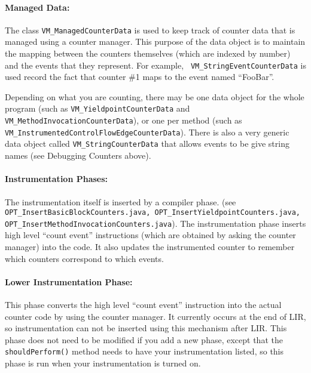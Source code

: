\paragraph{Managed Data:} The class {\tt VM\_ManagedCounterData} is used to
keep track of counter data that is managed using a counter
manager. This purpose of the data object is to maintain the mapping
between the counters themselves (which are indexed by number) and the
events that they represent.  For example, {\tt
VM\_StringEventCounterData} is used record the fact that counter \#1
maps to the event named ``FooBar''.  


Depending on what you are counting, there may be one data object for
the whole program (such as {\tt VM\_YieldpointCounterData} and
{\tt VM\_MethodInvocationCounterData}), or one per method (such as
{\tt VM\_InstrumentedControlFlowEdgeCounterData}).  There is also a
very generic data object called {\tt VM\_StringCounterData} that
allows events to be give string names (see Debugging Counters above).

\paragraph{Instrumentation Phases:}  The instrumentation itself is
inserted by a compiler phase.  (see
{\tt OPT\_InsertBasicBlockCounters.java,
OPT\_InsertYieldpointCounters.java,
OPT\_InsertMethodInvocationCounters.java}).  The instrumentation phase
inserts high level ``count event'' instructions (which are obtained by
asking the counter manager) into the code.  It also updates the
instrumented counter to remember which counters correspond to which
events.

\paragraph{Lower Instrumentation Phase:}  This phase 
converts the high level ``count event'' instruction into the actual
counter code by using the counter manager.  It currently occurs at the
end of LIR, so instrumentation can not be inserted using this
mechanism after LIR.  This phase does not need to be modified if you
add a new phase, except that the {\tt shouldPerform()} method needs to
have your instrumentation listed, so this phase is run when your
instrumentation is turned on.


